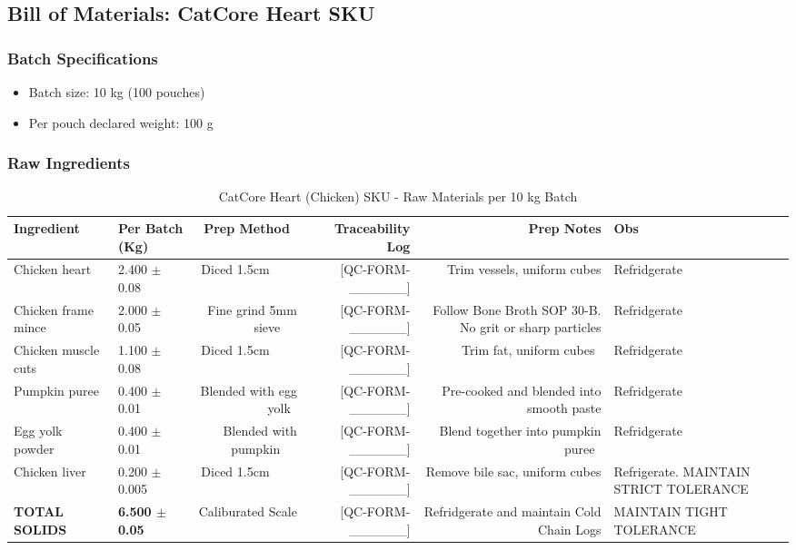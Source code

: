 \subsection*{Bill of Materials: CatCore Heart SKU}
\label{bom:catcore_heart}

\subsubsection*{Batch Specifications}
\begin{itemize}
\item Batch size: 10 kg (100 pouches)
\item Per pouch declared weight: 100 g
\end{itemize}

\subsubsection*{Raw Ingredients}
\begin{table}[h]
\centering
\caption{CatCore Heart (Chicken) SKU - Raw Materials per 10 kg Batch}
\begin{tabular}{@{}llrrrp{4cm}@{}}
\toprule
\textbf{Ingredient} & \textbf{Per Batch (Kg)} & \textbf{Prep Method}  & \textbf{Traceability Log} & \textbf{Prep Notes} & Obs\\
\midrule
Chicken heart       & 2.400 $\pm$0.08  & Diced 1.5cm            & [QC-FORM-\_\_\_\_\_\_] & Trim vessels, uniform cubes & Refridgerate\\
Chicken frame mince & 2.000 $\pm$0.05  & Fine grind 5mm sieve   & [QC-FORM-\_\_\_\_\_\_] & Follow Bone Broth SOP 30-B. No grit or sharp particles & Refridgerate  \\
Chicken muscle cuts & 1.100 $\pm$0.08  & Diced 1.5cm            & [QC-FORM-\_\_\_\_\_\_] & Trim fat, uniform cubes  & Refridgerate\\
Pumpkin puree       & 0.400 $\pm$0.01  & Blended with egg yolk  & [QC-FORM-\_\_\_\_\_\_] & Pre-cooked and blended into smooth paste & Refridgerate \\
Egg yolk powder     & 0.400 $\pm$0.01  & Blended with pumpkin   & [QC-FORM-\_\_\_\_\_\_] & Blend together into pumpkin puree  & Refridgerate  \\
Chicken liver       & 0.200 $\pm$0.005 & Diced 1.5cm            & [QC-FORM-\_\_\_\_\_\_] & Remove bile sac, uniform cubes & Refrigerate. MAINTAIN STRICT TOLERANCE \\
\midrule
\textbf{TOTAL SOLIDS} & \textbf{6.500 $\pm$0.05} & Caliburated Scale & [QC-FORM-\_\_\_\_\_\_] & Refridgerate and maintain Cold Chain Logs & MAINTAIN TIGHT TOLERANCE \\
\bottomrule
\end{tabular}
\end{table}

